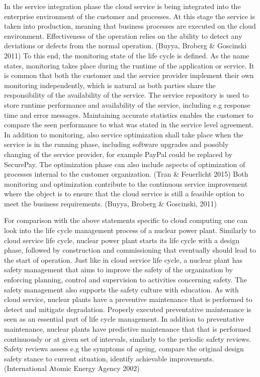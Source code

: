 \documentclass{article}
\begin{document}
In the service integration phase the cloud service is being integrated into the enterprise environment of the customer and processes. At this stage the service is taken into production, meaning that business processes are executed on the cloud environment. Effectiveness of the operation relies on the ability to detect any deviations or defects from the normal operation. (Buyya, Broberg \& Goscinski 2011) To this end, the monitoring state of the life cycle is defined. As the name states, monitoring takes place during the runtime of the application or service. It is common that both the customer and the service provider implement their own monitoring independently, which is natural as both parties share the responsibility of the availability of the service. The service repository is used to store runtime performance and availability of the service, including e.g response time and error messages. Maintaining accurate statistics enables  the customer to compare the seen performance to what was stated in the service level agreement. In addition to monitoring, also service optimization shall take place when the service is in the running phase, including software upgrades and possibly changing of the service provider, for example PayPal could be replaced by SecurePay. The optimization phase can also include aspects of optimization of processes internal to the customer organization. (Tran \& Feuerlicht 2015) Both monitoring and optimization contribute to the continuous service improvement where the object is to ensure that the cloud service is still a feasible option to meet the business requirements. (Buyya, Broberg \& Goscinski, 2011)
\par
For comparison with the above statements specific to cloud computing one can look into the life cycle management process of a nuclear power plant. Similarly to cloud service life cycle, nuclear power plant starts its life cycle with a design phase, followed by construction and commissioning that eventually should lead to the start of operation. Just like in cloud service life cycle, a nuclear plant has safety management that aims to improve the safety of the organization by enforcing planning, control and supervision to activities concerning safety. The safety management also supports the safety culture with education. As with cloud service, nuclear plants have a preventive maintenance that is performed to detect and mitigate degradation. Properly executed preventative maintenance is seen as an essential part of life cycle management. In addition to preventative maintenance, nuclear plants have predictive maintenance that that is performed continuously or at given set of intervals, similarly to the periodic safety reviews. Safety reviews assess e.g the symptoms of ageing, compare the original design safety stance to current situation, identify achievable improvements. (International Atomic Energy Agency 2002) 
\end{document}
